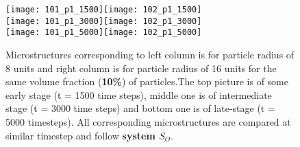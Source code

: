 \documentclass[12pt]{iiscthes}
\theoremstyle{definition}
\theoremstyle{definition}
\theoremstyle{remark}
\begin{document}
 \begin{figure}[H]
\begin{center}
\texttt{[image: 101\_p1\_1500]}\texttt{[image: 102\_p1\_1500]}\\
\texttt{[image: 101\_p1\_3000]}\texttt{[image: 102\_p1\_3000]}\\
\texttt{[image: 101\_p1\_5000]}\texttt{[image: 102\_p1\_5000]}\\
\caption{Microstructures corresponding to left column is for particle radius of 8 units and right column is for particle radius of 16 units for the same volume fraction (\textbf{10\%}) of particles.The top picture is of some early stage (t = 1500 time steps), middle one is of intermediate stage (t = 3000 time steps) and bottom one is of late-stage (t = 5000 timesteps). All corresponding microstructures are compared at similar timestep and follow \textbf{system $S_O$}.}\label{1012_p1}
\end{center}
\end{figure}
\end{document}
